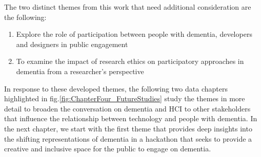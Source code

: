 The two distinct themes from this work that need additional consideration are the following:
\begin{enumerate}

    \item Explore the role of participation between people with dementia, developers and designers in public engagement 
    \item To examine the impact of research ethics on participatory approaches in dementia from a researcher's perspective
\end{enumerate}

In response to these developed themes, the following two data chapters highlighted in fig.\ref{fig:ChapterFour_FutureStudies} study the themes in more detail to broaden the conversation on dementia and HCI to other stakeholders that influence the relationship between technology and people with dementia. In the next chapter, we start with the first theme that provides deep insights into the shifting representations of dementia in a hackathon that seeks to provide a creative and inclusive space for the public to engage on dementia.
